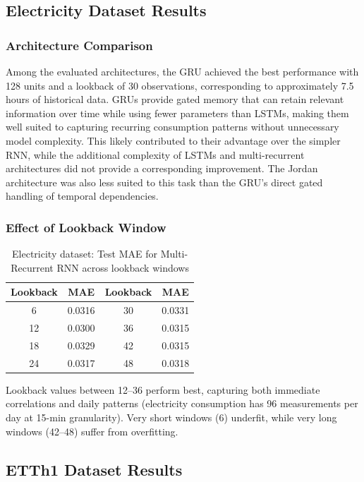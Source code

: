\documentclass[conference]{IEEEtran}
\begin{document}
\subsection{Electricity Dataset Results}

\subsubsection{Architecture Comparison}

Among the evaluated architectures, the GRU achieved the best
performance with 128 units and a lookback of 30 observations,
corresponding to approximately 7.5 hours of historical data.
GRUs provide gated memory that can retain relevant information over
time while using fewer parameters than LSTMs, making them well suited
to capturing recurring consumption patterns without unnecessary model
complexity. This likely contributed to their advantage over the simpler
RNN, while the additional complexity of LSTMs and multi-recurrent
architectures did not provide a corresponding improvement. The Jordan
architecture was also less suited to this task than the GRU's direct
gated handling of temporal dependencies.


\subsubsection{Effect of Lookback Window}

\begin{table}[H]
\centering
\caption{Electricity dataset: Test MAE for Multi-Recurrent RNN across lookback windows}
\label{tab:electricity_lookback}
\begin{tabular}{cc|cc}
\toprule
Lookback & MAE & Lookback & MAE \\
\midrule
6 & 0.0316 & 30 & 0.0331 \\
12 & 0.0300 & 36 & 0.0315 \\
18 & 0.0329 & 42 & 0.0315 \\
24 & 0.0317 & 48 & 0.0318 \\
\bottomrule
\end{tabular}
\end{table}

Lookback values between 12--36 perform best, capturing both
immediate correlations and daily patterns (electricity consumption
has 96 measurements per day at 15-min granularity). Very short
windows (6) underfit, while very long windows (42--48) suffer from
overfitting.

\subsection{ETTh1 Dataset Results}
\end{document}
